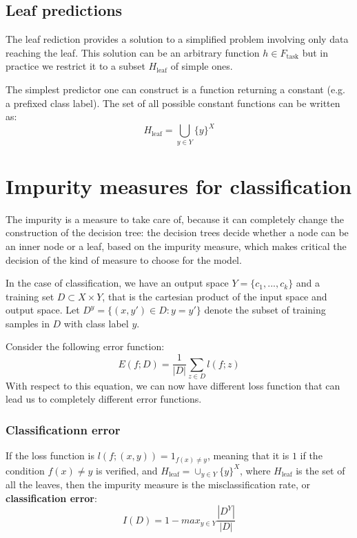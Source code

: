\subsection{Leaf predictions}
The leaf rediction provides a solution to a simplified problem involving only data reaching the leaf. This solution can be an arbitrary function \(h \in F_\text{task}\) but in practice we restrict it to a subset \(H_\text{leaf}\) of simple ones. 

The simplest predictor one can construct is a function returning a constant (e.g. a prefixed class label). The set of all possible constant functions can be written as:
\begin{equation}
    H_\text{leaf} = \bigcup_{y \in Y} \{y\}^X
\end{equation}

\section{Impurity measures for classification}
The impurity is a measure to take care of, because it can completely change the construction of the decision tree: the decision trees decide whether a node can be an inner node or a leaf, based on the impurity measure, which makes critical the decision of the kind of measure to choose for the model.

In the case of classification, we have an output space \(Y = \{c_1,...,c_k\}\) and a training set \(D \subset X \times Y\), that is the cartesian product of the input space and output space. Let \(D^y = \{(x,y') \in D : y = y'\}\) denote the subset of training samples in \(D\) with class label \(y\). 

Consider the following error function:
\[E(f;D) = \frac 1 {|D|} \sum_{z \in D} l(f;z)\]
With respect to this equation, we can now have different loss function that can lead us to completely different error functions.

\subsubsection{Classificationn error}
If the loss function is \(l(f;(x,y)) = 1_{f(x) \neq y}\), meaning that it is \(1\) if the condition \(f(x) \neq y\) is verified, and \(H_\text{leaf} = \cup_{y \in Y} \{y\}^X\), where \(H_\text{leaf}\) is the set of all the leaves, then the impurity measure is the misclassification rate, or \textbf{classification error}:
\begin{equation}
    I(D) = 1 - max_{y\in Y} \frac {|D^Y|} {|D|}
\end{equation}


